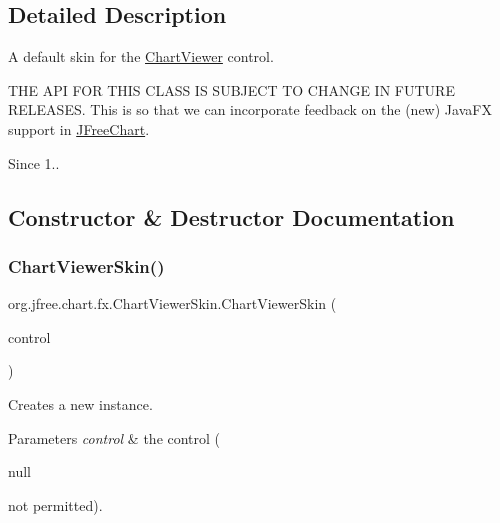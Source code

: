 \subsection{Detailed Description}
A default skin for the \mbox{\hyperlink{classorg_1_1jfree_1_1chart_1_1fx_1_1_chart_viewer}{Chart\+Viewer}} control.

T\+HE A\+PI F\+OR T\+H\+IS C\+L\+A\+SS IS S\+U\+B\+J\+E\+CT TO C\+H\+A\+N\+GE IN F\+U\+T\+U\+RE R\+E\+L\+E\+A\+S\+ES. This is so that we can incorporate feedback on the (new) Java\+FX support in \mbox{\hyperlink{classorg_1_1jfree_1_1chart_1_1_j_free_chart}{J\+Free\+Chart}}.

\begin{DoxySince}{Since}
1.. 
\end{DoxySince}


\subsection{Constructor \& Destructor Documentation}
\mbox{\label{classorg_1_1jfree_1_1chart_1_1fx_1_1_chart_viewer_skin_a8da40c1b58a9780eceafab28f6d97751}} 
\subsubsection{\texorpdfstring{Chart\+Viewer\+Skin()}{ChartViewerSkin()}}
{\footnotesize\ttfamily org.\+jfree.\+chart.\+fx.\+Chart\+Viewer\+Skin.\+Chart\+Viewer\+Skin (\begin{DoxyParamCaption}\item[{\mbox{\hyperlink{classorg_1_1jfree_1_1chart_1_1fx_1_1_chart_viewer}{Chart\+Viewer}}}]{control }\end{DoxyParamCaption})}

Creates a new instance.


\begin{DoxyParams}{Parameters}
{\em control} & the control (
\begin{DoxyCode}
null 
\end{DoxyCode}
 not permitted). \\
\hline
\end{DoxyParams}


